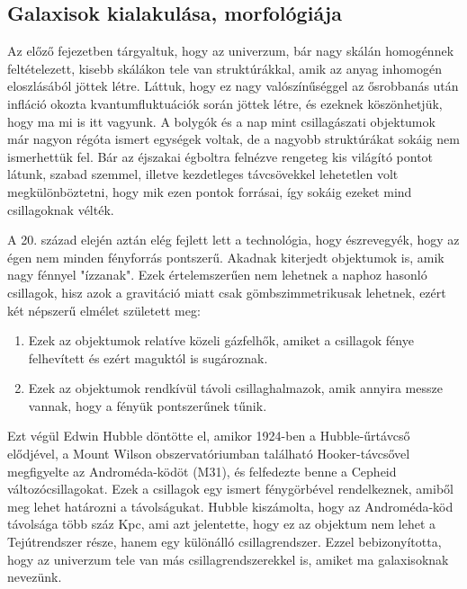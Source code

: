 \documentclass[../main.tex]{subfiles}
\begin{document}
\subsection{Galaxisok kialakulása, morfológiája}
Az előző fejezetben tárgyaltuk, hogy az univerzum, bár nagy skálán homogénnek feltételezett, kisebb skálákon tele van struktúrákkal, amik az anyag inhomogén eloszlásából jöttek létre.
Láttuk, hogy ez nagy valószínűséggel az ősrobbanás után infláció okozta kvantumfluktuációk során jöttek létre, és ezeknek köszönhetjük, hogy ma mi is itt vagyunk. A bolygók és a nap mint csillagászati 
objektumok már nagyon régóta ismert egységek voltak, de a nagyobb struktúrákat sokáig nem ismerhettük fel. Bár az éjszakai égboltra felnézve rengeteg kis világító pontot látunk, szabad szemmel, illetve kezdetleges
távcsövekkel lehetetlen volt megkülönböztetni, hogy mik ezen pontok forrásai, így sokáig ezeket mind csillagoknak vélték.

A 20. század elején aztán elég fejlett lett a technológia, hogy észrevegyék, hogy az égen nem minden fényforrás pontszerű. Akadnak kiterjedt objektumok is, amik nagy fénnyel "ízzanak".
Ezek értelemszerűen nem lehetnek a naphoz hasonló csillagok, hisz azok a gravitáció miatt csak gömbszimmetrikusak lehetnek, ezért két népszerű elmélet született meg:
\begin{enumerate}
    \item Ezek az objektumok relatíve közeli gázfelhők, amiket a csillagok fénye felhevített és ezért maguktól is sugároznak.
    \item Ezek az objektumok rendkívül távoli csillaghalmazok, amik annyira messze vannak, hogy a fényük pontszerűnek tűnik.
\end{enumerate}

Ezt végül Edwin Hubble döntötte el, amikor 1924-ben a Hubble-űrtávcső elődjével, a Mount Wilson obszervatóriumban található Hooker-távcsővel megfigyelte az Androméda-ködöt (M31),
és felfedezte benne a Cepheid változócsillagokat. Ezek a csillagok egy ismert fénygörbével rendelkeznek, amiből meg lehet határozni a távolságukat. Hubble kiszámolta, hogy az Androméda-köd távolsága
több száz Kpc, ami azt jelentette, hogy ez az objektum nem lehet a Tejútrendszer része, hanem egy különálló csillagrendszer. Ezzel bebizonyította, hogy az univerzum tele van más csillagrendszerekkel is,
amiket ma galaxisoknak nevezünk.
\end{document}
